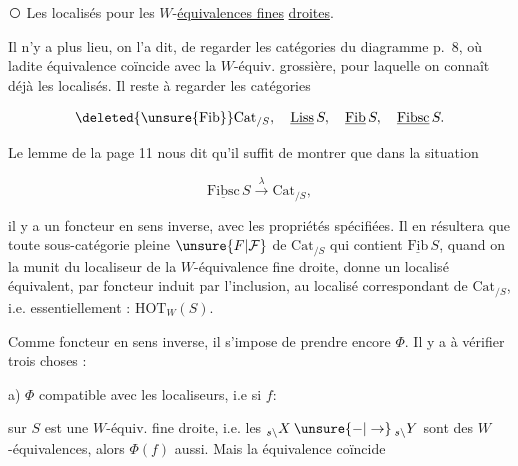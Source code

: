 
\textcircled{\scriptsize{}} Les localisés pour les $W$-\uline{équivalences fines} \uline{droites}.

Il n'y a plus lieu, on l'a dit, de regarder les catégories  du diagramme p.~8, où ladite équivalence coïncide avec la $W$-équiv. grossière, pour laquelle on connaît déjà les localisés. Il reste à regarder les catégories

\[
 \deleted{\unsure{\mathrm{Fib}}}\mathrm{Cat}_{/S},\quad \underline{\mathrm{Liss}}\,S,\quad \underline{\mathrm{Fib}}\,S,\quad \underline{\mathrm{Fibsc}}\,S .
\]

Le lemme de la page 11 nous dit  qu'il suffit de montrer que dans la situation

\[
 \underline{\mathrm{Fibsc}}\,S\xrightarrow{\lambda}\mathrm{Cat}_{/S},
\]

il y a un foncteur en sens inverse, avec les propriétés spécifiées. Il en résultera que toute sous-catégorie pleine $\unsure{F|\mathcal F}$ de $\mathrm{Cat}_{/S}$ qui contient $\underline{\mathrm{Fib}}\,S$, quand on la munit du localiseur de la $W$-équivalence fine droite, donne un localisé équivalent, par  foncteur induit par l'inclusion, au localisé correspondant de $\mathrm{Cat}_{/S}$, i.e. essentiellement : $\mathrm{HOT}_W(S)$.

Comme foncteur en sens inverse, il s'impose de prendre encore $\Phi$. Il y a à vérifier trois choses :

a) $\Phi$ compatible avec les localiseurs, i.e si $f\colon$


sur $S$ est une $W$-équiv. fine droite, i.e. les $ {}_{s\backslash}X\mathbin{\unsure{-|\to}}{}_{s\backslash}Y$ sont des $W$-équivalences, alors $\Phi(f)$ aussi. Mais la  équivalence coïncide

